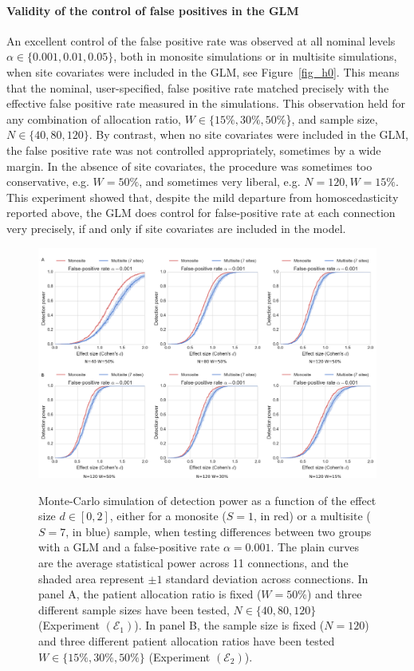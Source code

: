 \documentclass[authoryear]{elsarticle}
\begin{document}
\paragraph{Validity of the control of false positives in the GLM} An excellent control of the false positive rate was observed at all nominal levels $\alpha\in \{0.001, 0.01, 0.05\}$, both in monosite simulations or in multisite simulations, when site covariates were included in the GLM, see Figure~\ref{fig_h0}. This means that the nominal, user-specified, false positive rate matched precisely with the effective false positive rate measured in the simulations. This observation held for any combination of allocation ratio, $W\in\{15\%,30\%,50\%$\}, and sample size, $N\in\{40, 80, 120\}$. By contrast, when no site covariates were included in the GLM, the false positive rate was not controlled appropriately, sometimes by a wide margin. In the absence of site covariates, the procedure was sometimes too conservative, e.g. $W=50\%$, and sometimes very liberal, e.g. $N=120, W=15\%$. This experiment showed that, despite the mild departure from homoscedasticity reported above, the GLM does control for false-positive rate at each connection very precisely, if and only if site covariates are included in the model.

\begin{figure}[htbp]
\centering
{\includegraphics[width=\textwidth]{../figures/simulations_real_7sites.png}}

\caption{
Monte-Carlo simulation of detection power as a function of the effect size $d\in[0,2]$, either for a monosite ($S=1$, in red) or a multisite ($S=7$, in blue) sample, when testing differences between two groups with a GLM and a false-positive rate $\alpha=0.001$. The plain curves are the average statistical power across 11 connections, and the shaded area represent $\pm 1$ standard deviation across connections. In panel A, the patient allocation ratio is fixed ($W=50\%$) and three different sample sizes have been tested, $N\in\{40, 80, 120\}$ (Experiment $(\mathcal{E}_1)$). In panel B, the sample size is fixed ($N=120$) and three different patient allocation ratios have been tested $W\in \{15\%, 30\%,50\%\}$ (Experiment $(\mathcal{E}_2)$).
}
\label{fig_real_sim}
\end{figure}
\end{document}
